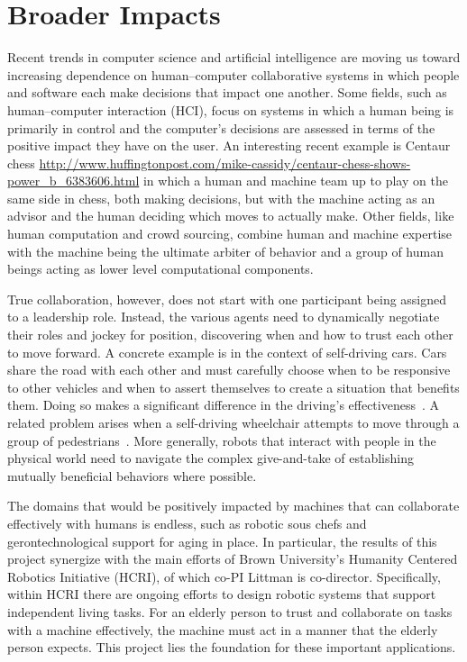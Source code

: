 
\section{Broader Impacts}

Recent trends in computer science and artificial intelligence are
moving us toward increasing dependence on human--computer
collaborative systems in which people and software each make decisions
that impact one another. Some fields, such as human--computer
interaction (HCI), focus on systems in which a human being is
primarily in control and the computer's decisions are assessed in
terms of the positive impact they have on the user. An interesting
recent example is Centaur chess
\url{http://www.huffingtonpost.com/mike-cassidy/centaur-chess-shows-power_b_6383606.html}
in which a human and machine team up to play on the same side in
chess, both making decisions, but with the machine acting as an
advisor and the human deciding which moves to actually make. Other
fields, like human computation and crowd sourcing, combine human and
machine expertise with the machine being the ultimate arbiter of
behavior and a group of human beings acting as lower level
computational components.

True collaboration, however, does not start with one participant being
assigned to a leadership role. Instead, the various agents need to
dynamically negotiate their roles and jockey for position, discovering
when and how to trust each other to move forward. A concrete example
is in the context of self-driving cars. Cars share the road with each
other and must carefully choose when to be responsive to other
vehicles and when to assert themselves to create a situation that
benefits them. Doing so makes a significant difference in the driving's
effectiveness~\cite{cunningham2015mpdm}. A related problem arises when
a self-driving wheelchair attempts to move through a group of
pedestrians~\cite{kim2016socially}. More generally, robots that
interact with people in the physical world need to navigate the
complex give-and-take of establishing mutually beneficial behaviors
where possible.


The domains that would be positively impacted by machines
that can collaborate effectively with humans is endless, such as robotic sous chefs and
gerontechnological support for aging in place.
%
In particular, the results of this project synergize with the main efforts of 
Brown University's Humanity Centered Robotics Initiative (HCRI), of
which co-PI Littman is co-director. Specifically, within HCRI there
are ongoing efforts to design robotic systems that support independent
living tasks. For an elderly person to trust and collaborate on tasks with a machine effectively, the machine must act in a manner that the elderly person expects. This project lies the foundation for these important applications.


